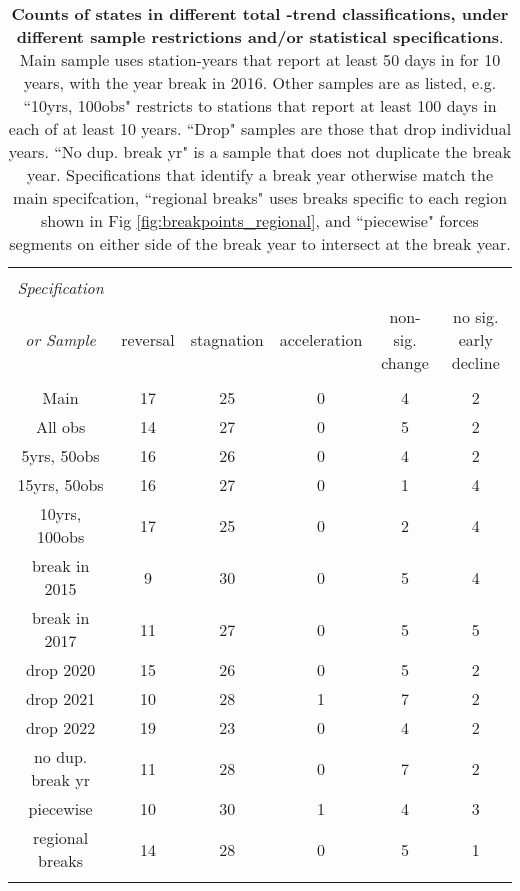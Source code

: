 \begin{table}[!htbp] \centering 
  \caption{\textbf{Counts of states in different total \pmt-trend classifications, under different sample restrictions and/or statistical specifications}. Main sample uses station-years that report at least 50 days in for 10 years, with the year break in 2016. Other samples are as listed, e.g. ``10yrs, 100obs" restricts to stations that report at least 100 days in each of at least 10 years. ``Drop" samples are those that drop individual years. ``No dup. break yr" is a sample that does not duplicate the break year. Specifications that identify a break year otherwise match the main specifcation, ``regional breaks" uses breaks specific to each region shown in Fig \ref{fig:breakpoints_regional}, and ``piecewise" forces segments on either side of the break year to intersect at the break year.} 
  \label{table:pmtrends} 
\footnotesize 
\begin{tabular}{@{\extracolsep{5pt}} cccccc} 
\\[-1.8ex]\hline 
\hline \\[-1.8ex] 
\textit{Specification} \\ 
                  \textit{or Sample} & reversal & stagnation & acceleration & non-sig. change & no sig. early decline \\ 
\hline \\[-1.8ex] 
Main & 17 & 25 & 0 & 4 & 2 \\ 
All obs & 14 & 27 & 0 & 5 & 2 \\ 
5yrs, 50obs & 16 & 26 & 0 & 4 & 2 \\ 
15yrs, 50obs & 16 & 27 & 0 & 1 & 4 \\ 
10yrs, 100obs & 17 & 25 & 0 & 2 & 4 \\ 
break in 2015 & 9 & 30 & 0 & 5 & 4 \\ 
break in 2017 & 11 & 27 & 0 & 5 & 5 \\ 
drop 2020 & 15 & 26 & 0 & 5 & 2 \\ 
drop 2021 & 10 & 28 & 1 & 7 & 2 \\ 
drop 2022 & 19 & 23 & 0 & 4 & 2 \\ 
no dup. break yr & 11 & 28 & 0 & 7 & 2 \\ 
piecewise & 10 & 30 & 1 & 4 & 3 \\ 
regional breaks & 14 & 28 & 0 & 5 & 1 \\ 
\hline \\[-1.8ex] 
\end{tabular} 
\end{table} 

